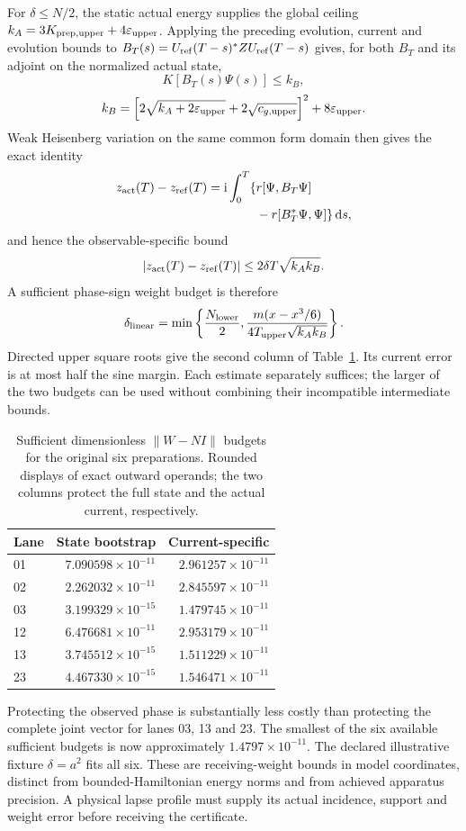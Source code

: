 For $\delta\le N/2$, the static actual energy supplies the global ceiling $k_A=3K_{{\rm prep},\rm upper}+4\varepsilon_{\rm upper}$. Applying the preceding evolution, current and evolution bounds to $B_T(s)=U_{\rm ref}(T-s)^*ZU_{\rm ref}(T-s)$ gives, for both $B_T$ and its adjoint on the normalized actual state,
\[
 K[B_T(s)\Psi(s)]\le k_B,
\]
\[
 k_B=\left[2\sqrt{k_A+2\varepsilon_{\rm upper}}+2\sqrt{c_{g,\rm upper}}\right]^2
       +8\varepsilon_{\rm upper}.
\]
Weak Heisenberg variation on the same common form domain then gives the exact identity
\[
\begin{aligned}
 z_{\rm act}(T)-z_{\rm ref}(T)=\mathrm{i}\int_0^T\{&r[\Psi,B_T\Psi]\\
                    &-r[B_T^*\Psi,\Psi]\}\,\mathrm{d} s,
\end{aligned}
\]
and hence the observable-specific bound
\[
 |z_{\rm act}(T)-z_{\rm ref}(T)|\le2\delta T\sqrt{k_Ak_B}.
\]
A sufficient phase-sign weight budget is therefore
\[
 \delta_{\rm linear}=\min\left\{\frac{N_{\rm lower}}2,
 \frac{m(x-x^3/6)}{4T_{\rm upper}\sqrt{k_Ak_B}}\right\}.
\]
Directed upper square roots give the second column of Table~\ref{tab:form-budgets}. Its current error is at most half the sine margin. Each estimate separately suffices; the larger of the two budgets can be used without combining their incompatible intermediate bounds.

\begin{table}[htbp]\centering\small
\caption{Sufficient dimensionless $\|W-NI\|$ budgets for the original six preparations. Rounded displays of exact outward operands; the two columns protect the full state and the actual current, respectively.}\label{tab:form-budgets}
\begin{tabular}{@{}lrr@{}}\toprule
Lane & State bootstrap & Current-specific\\\midrule
01 & $7.090598\!\times\!10^{-11}$ & $2.961257\!\times\!10^{-11}$\\
02 & $2.262032\!\times\!10^{-11}$ & $2.845597\!\times\!10^{-11}$\\
03 & $3.199329\!\times\!10^{-15}$ & $1.479745\!\times\!10^{-11}$\\
12 & $6.476681\!\times\!10^{-11}$ & $2.953179\!\times\!10^{-11}$\\
13 & $3.745512\!\times\!10^{-15}$ & $1.511229\!\times\!10^{-11}$\\
23 & $4.467330\!\times\!10^{-15}$ & $1.546471\!\times\!10^{-11}$\\
\bottomrule\end{tabular}\end{table}
Protecting the observed phase is substantially less costly than protecting the complete joint vector for lanes 03, 13 and 23. The smallest of the six available sufficient budgets is now approximately $1.4797\times10^{-11}$. The declared illustrative fixture $\delta=a^2$ fits all six. These are receiving-weight bounds in model coordinates, distinct from bounded-Hamiltonian energy norms and from achieved apparatus precision. A physical lapse profile must supply its actual incidence, support and weight error before receiving the certificate.

